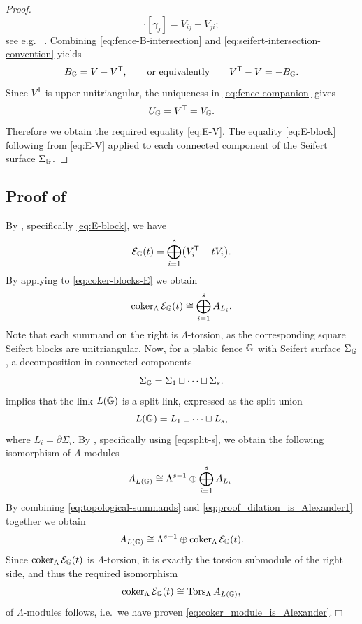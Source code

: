 \begin{proof}
\begin{equation}
 [\gamma_i]\cdot[\gamma_j]=V_{ij}-V_{ji};
\end{equation}
see e.g.~ \cite[Pages 200--203]{Rolfsen}.  Combining
\eqref{eq:fence-B-intersection} and
\eqref{eq:seifert-intersection-convention} yields
\[
 B_{\mathbb G}=V-V^{\mathsf T},
 \qquad\text{or equivalently}\qquad
 V^{\mathsf T}-V=-B_{\mathbb G}.
\]
Since $V^{\mathsf T}$ is upper unitriangular, the uniqueness in
\eqref{eq:fence-companion} gives
\begin{equation}\label{eq:U-is-Seifert}
 U_{\mathbb G}=V^{\mathsf T}=V_\mathbb G.
 \end{equation}
 Therefore we obtain the required equality \eqref{eq:E-V}. The equality \eqref{eq:E-block} following from \eqref{eq:E-V} applied to each connected component of the Seifert surface $\Sigma_\mathbb G$.
 \end{proof}

\subsection{Proof of }\label{ssec:proof_dilation_module_is_Alexander} By , specifically \eqref{eq:E-block}, we have
\begin{equation}\label{eq:coker-blocks-E}
  \mathcal E_\mathbb G(t)=
  \bigoplus_{i=1}^s
  \bigl(V_i^{\mathsf T}-tV_i\bigr).
\end{equation}
By applying  to \eqref{eq:coker-blocks-E} we obtain
\begin{equation}\label{eq:topological-summands}
\operatorname{coker}_\Lambda \mathcal E_\mathbb G(t)
   \cong
   \bigoplus_{i=1}^s A_{L_i}.
\end{equation}
Note that each summand on the right is $\Lambda$-torsion, as the corresponding square Seifert blocks are unitriangular. Now, for a plabic fence $\mathbb G$ with Seifert surface $\Sigma_\mathbb G$, a decomposition in connected components
\[
   \Sigma_\mathbb G=\Sigma_1\sqcup\cdots\sqcup\Sigma_s.
\]
implies that the link $L(\mathbb G)$ is a split link, expressed as the split union
\[
   L(\mathbb G)=L_1\sqcup\cdots\sqcup L_s,
\]
where $L_i=\partial\Sigma_i$. By , specifically using \eqref{eq:split-s}, we obtain the following isomorphism of $\Lambda$-modules \begin{equation}\label{eq:proof_dilation_is_Alexander1}
   A_{L(\mathbb G)}
   \cong
   \Lambda^{s-1}
   \oplus
   \bigoplus_{i=1}^s A_{L_i}.
\end{equation}
By combining \eqref{eq:topological-summands} and \eqref{eq:proof_dilation_is_Alexander1} together we obtain
\[
   A_{L(\mathbb G)}
   \cong
   \Lambda^{s-1}\oplus\operatorname{coker}_\Lambda \mathcal E_\mathbb G(t).
\]
Since $\operatorname{coker}_\Lambda \mathcal E_\mathbb G(t)$ is $\Lambda$-torsion, it is exactly the torsion submodule of the right side, and thus the required isomorphism
\[
   \operatorname{coker}_\Lambda \mathcal E_\mathbb G(t)
   \cong
   \operatorname{Tors}_\Lambda A_{L(\mathbb G)},
\]
of $\Lambda$-modules follows, i.e.~we have proven \eqref{eq:coker_module_is_Alexander}.\hfill$\Box$